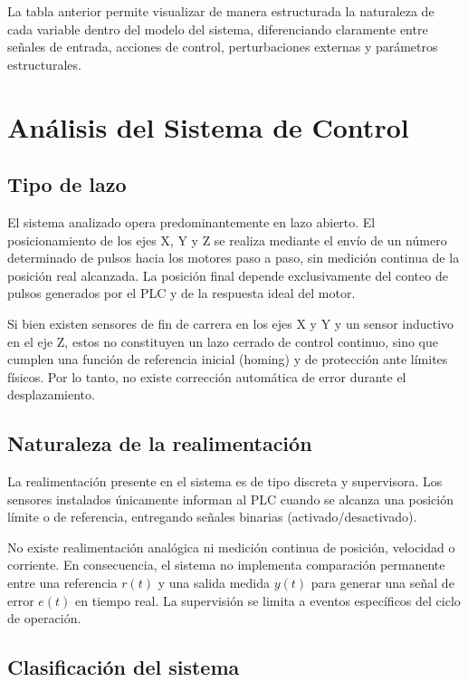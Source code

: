 \documentclass[a4paper,12pt]{article}
\begin{document}
La tabla anterior permite visualizar de manera estructurada la naturaleza de cada variable dentro del modelo del sistema, diferenciando claramente entre señales de entrada, acciones de control, perturbaciones externas y parámetros estructurales.





\section{Análisis del Sistema de Control}

\subsection{Tipo de lazo}

El sistema analizado opera predominantemente en lazo abierto. El posicionamiento de los ejes X, Y y Z se realiza mediante el envío de un número determinado de pulsos hacia los motores paso a paso, sin medición continua de la posición real alcanzada. La posición final depende exclusivamente del conteo de pulsos generados por el PLC y de la respuesta ideal del motor.

Si bien existen sensores de fin de carrera en los ejes X y Y y un sensor inductivo en el eje Z, estos no constituyen un lazo cerrado de control continuo, sino que cumplen una función de referencia inicial (homing) y de protección ante límites físicos. Por lo tanto, no existe corrección automática de error durante el desplazamiento.

\subsection{Naturaleza de la realimentación}

La realimentación presente en el sistema es de tipo discreta y supervisora. Los sensores instalados únicamente informan al PLC cuando se alcanza una posición límite o de referencia, entregando señales binarias (activado/desactivado).

No existe realimentación analógica ni medición continua de posición, velocidad o corriente. En consecuencia, el sistema no implementa comparación permanente entre una referencia $r(t)$ y una salida medida $y(t)$ para generar una señal de error $e(t)$ en tiempo real. La supervisión se limita a eventos específicos del ciclo de operación.

\subsection{Clasificación del sistema}
\end{document}
